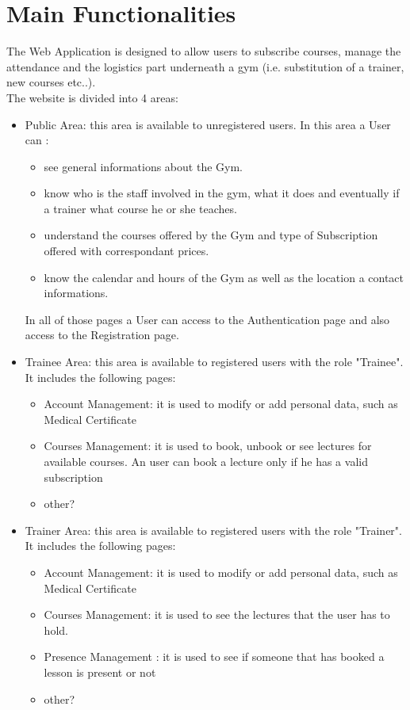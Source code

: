 \section{Main Functionalities}

The Web Application is designed to allow users to subscribe courses, manage the attendance and the logistics part underneath a gym (i.e. substitution of a trainer, new courses etc..).\\
The website is divided into 4 areas:

\begin{itemize}
	\item Public Area: this area is available to unregistered users. In this area a User can :
	\begin{itemize}
		\item see general informations about the Gym.
		\item know who is the staff involved in the gym, what it does and eventually if a trainer what course he or she teaches.
		\item understand the courses offered by the Gym and type of Subscription offered with correspondant prices.
		\item know the calendar and hours of the Gym as well as the location a contact informations.
	\end{itemize}	 
	In all of those pages a User can access to the Authentication page and also access to the Registration page. 
	\item Trainee Area: this area is available to registered users with the role "Trainee". It includes the following pages:
	\begin{itemize}
		\item Account Management: it is used to modify or add personal data, such as Medical Certificate
		\item Courses Management: it is used to book, unbook or see lectures for available courses. An user can book a lecture only if he has a valid subscription
		\item other?
	\end{itemize}
	\item Trainer Area: this area is available to registered users with the role "Trainer". It includes the following pages:
	\begin{itemize}
		\item Account Management: it is used to modify or add personal data, such as Medical Certificate
		\item Courses Management: it is used to see the lectures that the user has to hold.
		\item Presence Management : it is used to see if someone that has booked a lesson is present or not
		\item other?
		

\end{itemize}
\end{itemize}

